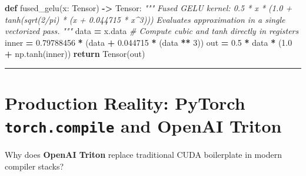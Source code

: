 \documentclass[
  letterpaper,
]{scrbook}
\newenvironment{Shaded}{\begin{snugshade}}{\end{snugshade}}
\newcommand{\CommentTok}[1]{\textcolor[rgb]{0.56,0.35,0.01}{\textit{#1}}}
\newcommand{\ControlFlowTok}[1]{\textcolor[rgb]{0.13,0.29,0.53}{\textbf{#1}}}
\newcommand{\DecValTok}[1]{\textcolor[rgb]{0.00,0.00,0.81}{#1}}
\newcommand{\FloatTok}[1]{\textcolor[rgb]{0.00,0.00,0.81}{#1}}
\newcommand{\KeywordTok}[1]{\textcolor[rgb]{0.13,0.29,0.53}{\textbf{#1}}}
\newcommand{\NormalTok}[1]{#1}
\newcommand{\OperatorTok}[1]{\textcolor[rgb]{0.81,0.36,0.00}{\textbf{#1}}}
\begin{document}
\begin{Shaded}
\begin{Highlighting}[]
\KeywordTok{def}\NormalTok{ fused\_gelu(x: Tensor) }\OperatorTok{{-}\textgreater{}}\NormalTok{ Tensor:}
    \CommentTok{"""}
\CommentTok{    Fused GELU kernel: 0.5 * x * (1.0 + tanh(sqrt(2/pi) * (x + 0.044715 * x\^{}3)))}
\CommentTok{    Evaluates approximation in a single vectorized pass.}
\CommentTok{    """}
\NormalTok{    data }\OperatorTok{=}\NormalTok{ x.data}
    \CommentTok{\# Compute cubic and tanh directly in registers}
\NormalTok{    inner }\OperatorTok{=} \FloatTok{0.79788456} \OperatorTok{*}\NormalTok{ (data }\OperatorTok{+} \FloatTok{0.044715} \OperatorTok{*}\NormalTok{ (data }\OperatorTok{**} \DecValTok{3}\NormalTok{))}
\NormalTok{    out }\OperatorTok{=} \FloatTok{0.5} \OperatorTok{*}\NormalTok{ data }\OperatorTok{*}\NormalTok{ (}\FloatTok{1.0} \OperatorTok{+}\NormalTok{ np.tanh(inner))}
    \ControlFlowTok{return}\NormalTok{ Tensor(out)}
\end{Highlighting}
\end{Shaded}

\begin{center}\rule{0.5\linewidth}{0.5pt}\end{center}

\section{\texorpdfstring{Production Reality: PyTorch
\texttt{torch.compile} and OpenAI
Triton}{Production Reality: PyTorch torch.compile and OpenAI Triton}}\label{production-reality-pytorch-torch.compile-and-openai-triton}

Why does \textbf{OpenAI Triton} replace traditional CUDA boilerplate in
modern compiler stacks?
\end{document}

